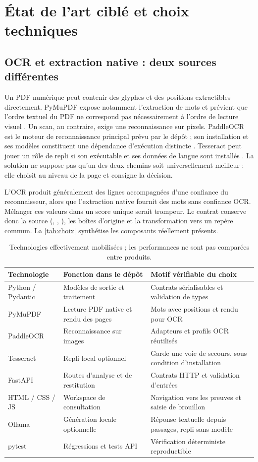 \chapter{État de l'art ciblé et choix techniques}\label{chap:etat-art}
\section{OCR et extraction native : deux sources différentes}
Un PDF numérique peut contenir des glyphes et des positions extractibles directement. PyMuPDF expose notamment l'extraction de mots et prévient que l'ordre textuel du PDF ne correspond pas nécessairement à l'ordre de lecture visuel \cite{pymupdf}. Un scan, au contraire, exige une reconnaissance sur pixels. PaddleOCR est le moteur de reconnaissance principal prévu par le dépôt ; son installation et ses modèles constituent une dépendance d'exécution distincte \cite{paddle}. Tesseract peut jouer un rôle de repli si son exécutable et ses données de langue sont installés \cite{tesseract}. La solution ne suppose pas qu'un des deux chemins soit universellement meilleur : elle choisit au niveau de la page et consigne la décision.

L'OCR produit généralement des lignes accompagnées d'une confiance du reconnaisseur, alors que l'extraction native fournit des mots sans confiance OCR. Mélanger ces valeurs dans un score unique serait trompeur. Le contrat conserve donc la source (\texttt{}, \texttt{}, \texttt{}), les boîtes d'origine et la transformation vers un repère commun. La \autoref{tab:choix} synthétise les composants réellement présents.

\begin{table}[htbp]\centering\tighttable
\begin{tabularx}{\textwidth}{@{}p{26mm}Y Y@{}}\toprule
Technologie & Fonction dans le dépôt & Motif vérifiable du choix\\\midrule
Python / Pydantic & Modèles de sortie et traitement & Contrats sérialisables et validation de types\\
PyMuPDF & Lecture PDF native et rendu des pages & Mots avec positions et rendu pour OCR\\
PaddleOCR & Reconnaissance sur images & Adapteurs et profils OCR réutilisés\\
Tesseract & Repli local optionnel & Garde une voie de secours, sous condition d'installation\\
FastAPI & Routes d'analyse et de restitution & Contrats HTTP et validation d'entrées\\
HTML / CSS / JS & Workspace de consultation & Navigation vers les preuves et saisie de brouillon\\
Ollama & Génération locale optionnelle & Réponse textuelle depuis passages, repli sans modèle\\
pytest & Régressions et tests API & Vérification déterministe reproductible\\\bottomrule
\end{tabularx}
\caption{Technologies effectivement mobilisées ; les performances ne sont pas comparées entre produits.}\label{tab:choix}
\end{table}

